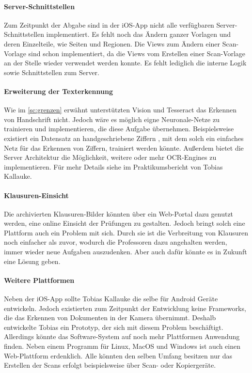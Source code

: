 \documentclass[notables, nomenclature, oneside, 150]{HSMW-Thesis}
\begin{document}
	\paragraph*{Server-Schnittstellen} 
		Zum Zeitpunkt der Abgabe sind in der iOS-App nicht alle verfügbaren Server-Schnittstellen implementiert. Es fehlt noch das Ändern ganzer Vorlagen und deren Einzelteile, wie Seiten und Regionen. Die Views zum Ändern einer Scan-Vorlage sind schon implementiert, da die Views vom Erstellen einer Scan-Vorlage an der Stelle wieder verwendet werden konnte. Es fehlt lediglich die interne Logik sowie Schnittstellen zum Server.	
	
	\paragraph*{Erweiterung der Texterkennung} 
		Wie im \autoref{sc:grenzen} erwähnt unterstützten Vision und Tesseract das Erkennen von Handschrift nicht. Jedoch wäre es möglich eigne Neuronale-Netze zu trainieren und implementieren, die diese Aufgabe übernehmen. Beispielsweise existiert ein Datensatz an handgeschriebene Ziffern , mit dem solch ein einfaches Netz für das Erkennen von Ziffern, trainiert werden könnte. Außerdem bietet die Server Architektur die Möglichkeit, weitere oder mehr OCR-Engines zu implementieren. Für mehr Details siehe im Praktikumsbericht von Tobias Kallauke.
	
	\paragraph*{Klausuren-Einsicht} 
		Die archivierten Klausuren-Bilder könnten über ein Web-Portal dazu genutzt werden, eine online Einsicht der Prüfungen zu gestalten. Jedoch bringt solch eine Plattform auch ein Problem mit sich. Durch sie ist die Verbreitung von Klausuren noch einfacher als zuvor, wodurch die Professoren dazu angehalten werden, immer wieder neue Aufgaben auszudenken. Aber auch dafür könnte es in Zukunft eine Lösung geben. 
	
	\paragraph*{Weitere Plattformen} 
		Neben der iOS-App sollte Tobias Kallauke die selbe für Android Geräte entwickeln. Jedoch existierten zum Zeitpunkt der Entwicklung keine Frameworks, die das Erkennen von Dokumenten in der Kamera übernimmt. Deshalb entwickelte Tobias ein Prototyp, der sich mit diesem Problem beschäftigt. Allerdings könnte das Software-System auf noch mehr Plattformen Anwendung finden. Neben einem Programm für Linux, MacOS und Windows ist auch einen Web-Plattform  erdenklich. Alle könnten den selben Umfang besitzen nur das Erstellen der Scans erfolgt beispielsweise über Scan- oder Kopiergeräte.
	
\end{document}
